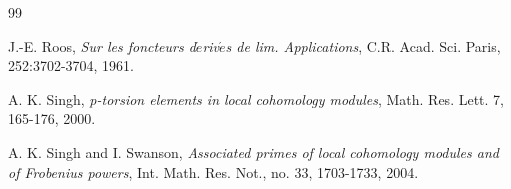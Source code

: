 \documentclass[10pt]{amsart}
\theoremstyle{plain}
\theoremstyle{definition}
\begin{document}
\begin{thebibliography}{99}


J.-E. Roos, {\it Sur les foncteurs d$\acute{e}$riv$\acute{e}$s de lim. Applications}, C.R. Acad. Sci. Paris, 252:3702-3704, 1961. 

A. K. Singh, {\it p-torsion elements in local cohomology modules}, Math. Res. Lett. 7, 165-176, 2000.

A. K. Singh and I. Swanson, {\it Associated primes of local cohomology modules and of Frobenius powers}, Int. Math. Res. Not., no. 33, 1703-1733, 2004.
\end{thebibliography}
\end{document}
